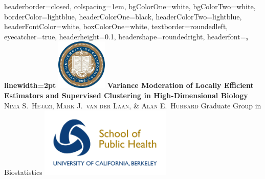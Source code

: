 \documentclass[landscape,a0paper,fontscale=0.285]{baposter} %
\newcommand{\1}{\mathbbm{1}}
\begin{document}
\begin{poster}
{
headerborder=closed, %
colspacing=1em, %
bgColorOne=white, %
bgColorTwo=white, %
borderColor=lightblue, %
headerColorOne=black, %
headerColorTwo=lightblue, %
headerFontColor=white, %
boxColorOne=white, %
textborder=roundedleft, %
eyecatcher=true, %
headerheight=0.1\textheight, %
headershape=roundedright, %
headerfont=\Large\bf\textsc, %
linewidth=2pt %
}
%
{\includegraphics[height=6.5em]{logo_cal.jpg}} %
{\textbf{\LARGE Variance Moderation of Locally Efficient Estimators and
    Supervised Clustering in High-Dimensional Biology\vspace{0.5em}}} %
{\textsc{Nima S.~Hejazi, Mark J.~van der Laan, \& Alan E.~Hubbard} \hspace{12pt}
  Graduate Group in Biostatistics} %
{\includegraphics[height=9em]{logo_sph.jpg}} %


\end{poster}
\end{document}
